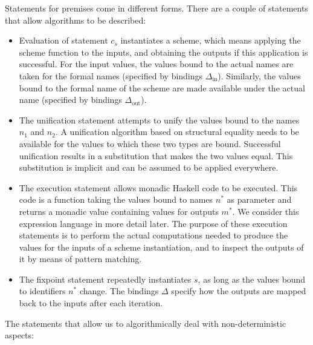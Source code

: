 \documentclass[preprint,natbib]{sigplanconf}
\newcommand\Statement{c}
\newcommand\Bindings{\Delta}
\newcommand\SchemeName{s}
\newcommand\Idents[1]{{#1}^{\!*}}
\newcommand\In{\mbox{in}}
\newcommand\Out{\mbox{out}}
\begin{document}
    Statements for premises come in different forms. There are a couple of statements that allow algorithms
    to be described:
    \begin{itemize}
    \item Evaluation of statement $\Statement_{\SchemeName}$
      instantiates a scheme, which means applying the scheme function to the inputs, and obtaining the
      outputs if this application is successful. For the input values, the values bound to the actual names
      are taken for the formal names (specified by bindings $\Bindings_{\In}$). Similarly, the values bound
      to the formal name of the scheme are made available under the actual name (specified by bindings
      $\Bindings_{\Out}$).
    \item The unification statement attempts to unify the values bound to the names $n_1$ and $n_2$.
      A unification algorithm based on structural equality needs to be available for the values to which
      these two types are bound. Successful unification results in a substitution that makes the two values
      equal. This substitution is implicit and can be assumed to be applied everywhere.
    \item The execution statement allows monadic Haskell code to be executed. This code is a function taking
      the values bound to names $\Idents{n}$ as parameter and returns a monadic value containing values for outputs
      $m^*$. We consider this expression language in more detail later. The purpose of these execution statements
      is to perform the actual computations needed to produce the values for the inputs of a scheme instantiation,
      and to inspect the outputs of it by means of pattern matching.
    \item The fixpoint statement repeatedly instantiates $\SchemeName$, as long as the values bound to
      identifiers $\Idents{n}$ change. The bindings $\Bindings$ specify how the outputs are mapped back to
      the inputs after each iteration.
    \end{itemize}
    The statements that allow us to algorithmically deal with non-deterministic aspects:
\end{document}
